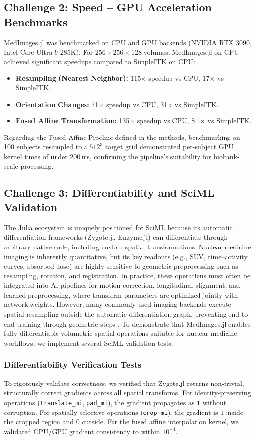 \documentclass[10pt,letterpaper]{article}
\begin{document}
\subsection*{Challenge 2: Speed -- GPU Acceleration Benchmarks}
MedImages.jl was benchmarked on CPU and GPU backends (NVIDIA RTX 3090, Intel Core Ultra 9 285K). For $256 \times 256 \times 128$ volumes, MedImages.jl on GPU achieved significant speedups compared to SimpleITK on CPU:
\begin{itemize}
    \item \textbf{Resampling (Nearest Neighbor):} 115$\times$ speedup vs CPU, 17$\times$ vs SimpleITK.
    \item \textbf{Orientation Changes:} 71$\times$ speedup vs CPU, 31$\times$ vs SimpleITK.
    \item \textbf{Fused Affine Transformation:} 135$\times$ speedup vs CPU, 8.1$\times$ vs SimpleITK.
\end{itemize}

Regarding the Fused Affine Pipeline defined in the methods, benchmarking on 100 subjects resampled to a $512^3$ target grid demonstrated per-subject GPU kernel times of under 200\,ms, confirming the pipeline's suitability for biobank-scale processing.

\subsection*{Challenge 3: Differentiability and SciML Validation}
The Julia ecosystem is uniquely positioned for SciML because its automatic differentiation frameworks (Zygote.jl, Enzyme.jl) can differentiate through arbitrary native code, including custom spatial transformations. Nuclear medicine imaging is inherently quantitative, but its key readouts (e.g., SUV, time–activity curves, absorbed dose) are highly sensitive to geometric preprocessing such as resampling, rotation, and registration. In practice, these operations must often be integrated into AI pipelines for motion correction, longitudinal alignment, and learned preprocessing, where transform parameters are optimized jointly with network weights. However, many commonly used imaging backends execute spatial resampling outside the automatic differentiation graph, preventing end-to-end training through geometric steps \cite{Berman_2024}. To demonstrate that MedImages.jl enables fully differentiable volumetric spatial operations suitable for nuclear medicine workflows, we implement several SciML validation tests.

\subsubsection*{Differentiability Verification Tests}
To rigorously validate correctness, we verified that Zygote.jl returns non-trivial, structurally correct gradients across all spatial transforms. For identity-preserving operations (\texttt{translate\_mi}, \texttt{pad\_mi}), the gradient propagates as $\mathbf{1}$ without corruption. For spatially selective operations (\texttt{crop\_mi}), the gradient is $1$ inside the cropped region and $0$ outside. For the fused affine interpolation kernel, we validated CPU/GPU gradient consistency to within $10^{-4}$.
\end{document}
